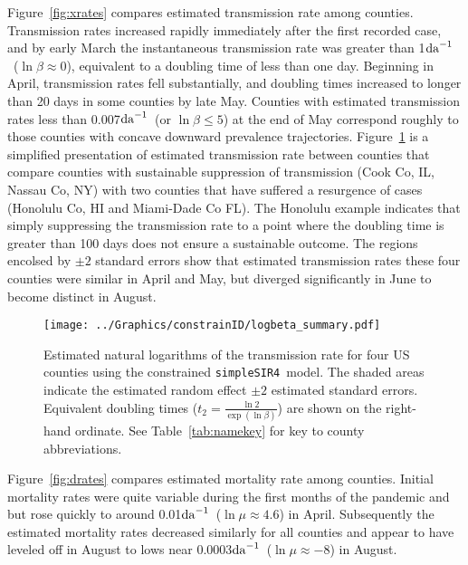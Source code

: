 \documentclass[12pt,letterpaper]{article}
\newcommand\perda{$\rm{da}^{-1}$}
\newcommand\SSm{{\tt simpleSIR4}}
\begin{document}
Figure~\ref{fig:xrates} compares estimated transmission rate among
counties.
Transmission rates increased rapidly immediately after the first
recorded case, and by early March the instantaneous transmission rate was greater
than 1\perda\ ($\ln \beta \approx 0$),
equivalent to a doubling time of less than one day.
Beginning in April, transmission rates fell substantially, and doubling times
increased to longer than 20 days in some counties by late May.
Counties with estimated transmission rates less than 0.007\perda\ 
(or $\ln \beta \le 5$) at the end of May
correspond roughly to those counties with concave downward prevalence
trajectories.
Figure~\ref{fig:xrates2} is a simplified presentation of estimated
transmission rate between counties that compare counties with sustainable
suppression of transmission (Cook Co, IL, Nassau Co, NY) with two counties that
have suffered a resurgence of cases (Honolulu Co, HI and Miami-Dade Co
FL). The Honolulu example indicates that simply suppressing the
transmission rate to a point where the doubling time is greater than
100 days does not ensure a sustainable outcome. The regions encolsed
by $\pm 2$ standard errors show that estimated transmission rates these four counties
were similar in April and May, but diverged significantly in June to
become distinct in August.

\begin{figure}[h!]
\begin{center}
\texttt{[image: ../Graphics/constrainID/logbeta\_summary.pdf]}\\
\end{center}
\caption{\label{fig:xrates2}
Estimated natural logarithms of the transmission rate for four US
counties using the constrained \SSm\ model.
The shaded areas indicate the estimated random effect $\pm 2$
estimated standard errors.
Equivalent doubling times ($t_2 = \frac{\ln 2}{\exp(\ln \beta)}$)
are shown on the right-hand ordinate.
See Table~\ref{tab:namekey} for key to county abbreviations.
}
\end{figure}

Figure~\ref{fig:drates} compares estimated mortality rate among
counties. Initial mortality rates were quite variable during the first
months of the pandemic and but rose quickly to around 
0.01\perda\ ($\ln \mu \approx 4.6$) in April. Subsequently the
estimated mortality rates decreased similarly for all counties and appear to
have leveled off in August to lows near
0.0003\perda\ ($\ln \mu \approx -8$) in August.
\end{document}
